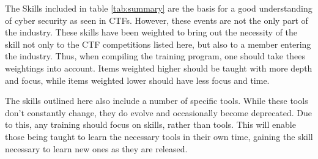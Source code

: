 \documentclass[a4paper,11pt]{report}
\begin{document}
	The Skills included in table \ref{tab:summary} are the basis for a good understanding of cyber security as seen in CTFs. 
	However, these events are not the only part of the industry. 
	These skills have been weighted to bring out the necessity of the skill not only to the CTF competitions listed here, 
	but also to a member entering the industry. 
	Thus, when compiling the training program, one should take thees weightings into account. 
	Items weighted higher should be taught with more depth and focus, while items weighted lower should have less focus and time. 

	The skills outlined here also include a number of specific tools. 
	While these tools don't constantly change, they do evolve and occasionally become deprecated. 
	Due to this, any training should focus on skills, rather than tools. 
	This will enable those being taught to learn the necessary tools in their own time, 
	gaining the skill necessary to learn new ones as they are released. 
\appendix
	\label{ch:Appendix}
	\listoftables
\end{document}
